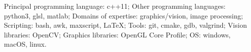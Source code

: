 
\begin{cvskills}
  \cvskill
    {Principal programming language:}
    {c++11;}
  \cvskill
    {Other programming languages:}
    {python3, glsl, matlab;}
  \cvskill
    {Domains of expertise:}
    {graphics/vision, image processing;}
  \cvskill
    {Scripting:}
    {bash, awk, maxscript, LaTeX;}
  \cvskill
    {Tools:}
    {git, cmake, gdb, valgrind;}
  \cvskill
    {Vision libraries:}
    {OpenCV;}
  \cvskill
    {Graphics libraries:}
    {OpenGL Core Profile;}
  \cvskill
    {OS:}
    {windows, macOS, linux.}
\end{cvskills}

\begin{center}
\vspace{10.0mm}
\end{center}

%
